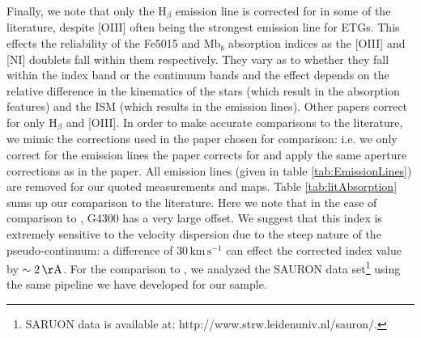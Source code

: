 	Finally, we note that only the H$_\beta$ emission line is corrected for in some of the literature, despite [OIII] often being the strongest emission line for ETGs. This effects the reliability of the Fe5015 and Mb$_b$ absorption indices as the [OIII] and [NI] doublets fall within them respectively. They vary as to whether they fall within the index band or the continuum bands and the effect depends on the relative difference in the kinematics of the stars (which result in the absorption features) and the ISM (which results in the emission lines). Other papers correct for only H$_\beta$ and [OIII]. In order to make accurate comparisons to the literature, we mimic the corrections used in the paper chosen for comparison: i.e. we only correct for the emission lines the paper corrects for and apply the same aperture corrections as in the paper. All emission lines (given in table \ref{tab:EmissionLines}) are removed for our quoted measurements and maps. Table \ref{tab:litAbsorption} sums up our comparison to the literature. Here we note that in the case of comparison to \citet{Rampazzo2005}, G4300 has a very large offset. We suggest that this index is extremely sensitive to the velocity dispersion due to the steep nature of the pseudo-continuum: a difference of $30 \, \mathrm{km \, s^{-1}}$ can effect the corrected index value by $\sim 2 \, \mathrm{\AA}$. For the comparison to \citet{Vazdekis2010}, we analyzed the SAURON data set\footnote{SARUON data is available at: http://www.strw.leidenuniv.nl/sauron/.} \citep{Emsellem2004} using the same pipeline we have developed for our sample. 

